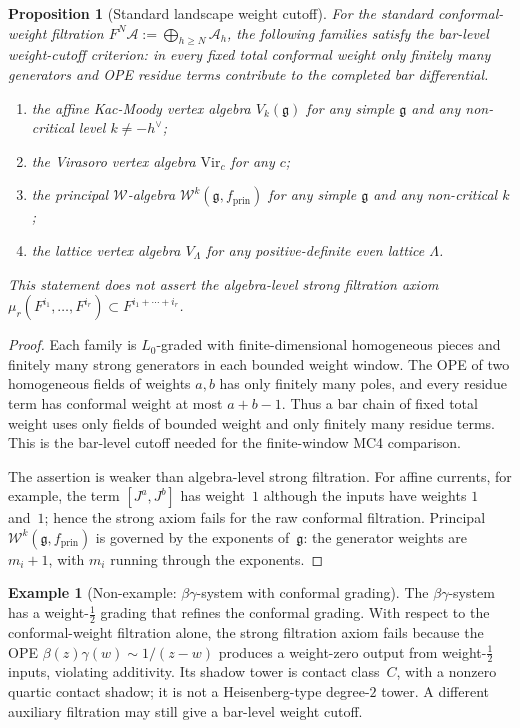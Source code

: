 \documentclass[11pt,reqno]{amsart}
\newtheorem{proposition}[theorem]{Proposition}
\theoremstyle{definition}
\newtheorem{example}[theorem]{Example}
\theoremstyle{remark}
\newcommand{\cA}{\mathcal{A}}
\newcommand{\cW}{\mathcal{W}}
\newcommand{\fg}{\mathfrak{g}}
\newcommand{\Vir}{\mathrm{Vir}}
\numberwithin{equation}{section}
\begin{document}
\begin{proposition}[Standard landscape weight cutoff]
\label{prop:examples}
For the standard conformal-weight filtration
$F^N\cA := \bigoplus_{h \ge N}\cA_h$, the following families
satisfy the bar-level weight-cutoff criterion: in every fixed
total conformal weight only finitely many generators and OPE
residue terms contribute to the completed bar differential.
\begin{enumerate}[label=\textup{(\alph*)}]
\item the affine Kac-Moody vertex algebra $V_k(\fg)$ for
 any simple $\fg$ and any non-critical level
 $k \ne -h^\vee$;
\item the Virasoro vertex algebra $\Vir_c$ for any $c$;
\item the principal $\cW$-algebra $\cW^k(\fg, f_{\mathrm{prin}})$
 for any simple $\fg$ and any non-critical $k$;
\item the lattice vertex algebra $V_\Lambda$ for any
 positive-definite even lattice $\Lambda$.
\end{enumerate}
This statement does not assert the algebra-level strong
filtration axiom
$\mu_r(F^{i_1},\ldots,F^{i_r})\subset F^{i_1+\cdots+i_r}$.
\end{proposition}

\begin{proof}
Each family is $L_0$-graded with finite-dimensional homogeneous
pieces and finitely many strong generators in each bounded weight
window. The OPE of two homogeneous fields of weights $a,b$ has
only finitely many poles, and every residue term has conformal
weight at most $a+b-1$. Thus a bar chain of fixed total weight
uses only fields of bounded weight and only finitely many residue
terms. This is the bar-level cutoff needed for the finite-window
MC4 comparison.

The assertion is weaker than algebra-level strong filtration.
For affine currents, for example, the term
$[J^a,J^b]$ has weight~$1$ although the inputs have weights
$1$ and~$1$; hence the strong axiom fails for the raw conformal
filtration. Principal $\cW^k(\fg,f_{\mathrm{prin}})$ is governed
by the exponents of~$\fg$: the generator weights are $m_i+1$,
with $m_i$ running through the exponents.
\end{proof}

\begin{example}[Non-example: $\beta\gamma$-system with
conformal grading]
\label{ex:non-example}
The $\beta\gamma$-system has a weight-$\tfrac12$ grading that
refines the conformal grading. With respect to the
conformal-weight filtration alone, the strong filtration
axiom fails because the OPE
$\beta(z)\gamma(w) \sim 1/(z-w)$ produces a weight-zero
output from weight-$\tfrac12$ inputs, violating additivity.
Its shadow tower is contact class~$C$, with a nonzero quartic
contact shadow; it is not a Heisenberg-type degree-$2$ tower.
A different auxiliary filtration may still give a bar-level
weight cutoff.
\end{example}
\end{document}
